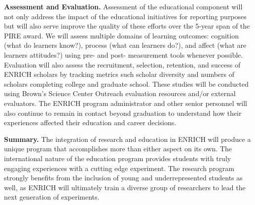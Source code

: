 \documentclass[preprint,11pt]{aastex}
\begin{document}
\textbf{Assessment and Evaluation.} Assessment of the educational component will not only address the impact of the educational initiatives for reporting purposes but will also serve improve the quality of these efforts over the 5-year span of the PIRE award.  We will assess multiple domains of learning outcomes: cognition (what do learners know?), process (what can learners do?), and affect (what are learners attitudes?) using pre- and post- measurement tools whenever possible.  Evaluation will also assess the recruitment, selection, retention, and success of ENRICH scholars by tracking metrics such scholar diversity and numbers of scholars completing college and graduate school. These studies will be conducted using Brown’s Science Center Outreach evaluation resources and/or external evaluators.  The ENRICH program administrator and other senior personnel will also continue to remain in contact beyond graduation to understand how their experiences affected their education and career decisions.

\textbf{Summary.} The integration of research and education in ENRICH will produce a unique program that accomplishes more than either aspect on its own.  The international nature of the education program provides students with truly engaging experiences with a cutting edge experiment.  The research program strongly benefits from the inclusion of young and underrepresented students as well, as ENRICH will ultimately train a diverse group of researchers to lead the next generation of experiments.  

\clearpage
\setcounter{page}{1}
\thispagestyle{empty}


\end{document}
